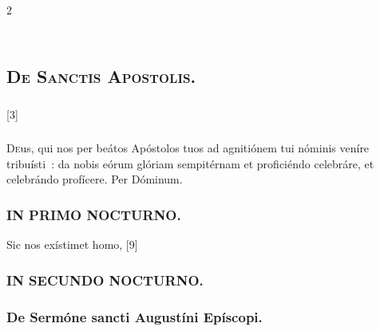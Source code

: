 \documentclass[9pt,twoside]{extarticle}
\begin{document}
\begin{multicols}{2}
{\subsection*{\center {}}
\subsection*{\center \textsc{\\ De Sanctis Apostolis.}}
\subsubsection*{\center {}}

\begin{tightlist}{}
\item {} [3] 
\end{tightlist}

\subsubsection*{\center {}}
\lettrine{D}eus, qui nos per beátos Apóstolos tuos ad agnitiónem tui nóminis veníre tribuísti~: da nobis eórum glóriam sempitérnam et proficiéndo celebráre, et celebrándo profícere. Per Dóminum.

\subsubsection*{\center \textsc{IN PRIMO NOCTURNO.}}
\begin{tightlist}{}
\item {} Sic nos exístimet homo,  [9]
\end{tightlist}

\subsubsection*{\center \textsc{IN SECUNDO NOCTURNO.}}

\subsubsection*{\center De Sermóne sancti Augustíni Epíscopi.}
}
\end{multicols}
\end{document}
